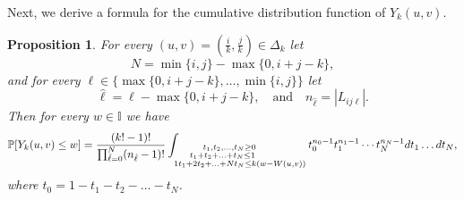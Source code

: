 \documentclass[12pt,a4paper]{amsart}
\newtheorem{proposition}[theorem]{Proposition}
\theoremstyle{definition}
\newcommand{\II}{\mathbb{I}}
\newcommand{\DK}{\Delta_k}
\newcommand{\PP}{\mathbb{P}}
\newcommand{\hell}{\hat{\ell}}
\begin{document}
Next, we derive a formula for the cumulative distribution function of $Y_k(u,v)$.
\begin{proposition}
For every $(u,v)=(\tfrac{i}{k},\tfrac{j}{k}) \in \DK$ let
$$N=\min\{i,j\}-\max\{0,i+j-k\},$$
and for every $\ell \in \bigl\{\max\{0,i+j-k\},\ldots,\min\{i,j\} \bigr\}$ let
$$\hell=\ell-\max\{0,i+j-k\}, \quad \text{and} \quad n_{\hell}=|L_{ij\ell}|.$$
Then for every $w \in \II$ we have
    \begin{equation*}
    \PP[Y_k(u,v) \le w] =\frac{(k!-1)!}{\prod_{\hell=0}^N (n_{\hell}-1)!} \int_{\substack{t_1,t_2,\ldots,t_N \ge 0\hspace{0.67cm}\\t_1+t_2+\ldots+t_N \le 1 \hspace{1.11cm}\\ 1t_1+2t_2+\ldots+Nt_N \le k(w-W(u,v))}} t_0^{n_{0}-1} t_1^{n_{1}-1}\cdots t_N^{n_{N}-1} dt_1 \ldots dt_N,
\end{equation*}
where $t_0=1-t_1-t_2-\ldots-t_N$.
\end{proposition}
\end{document}
